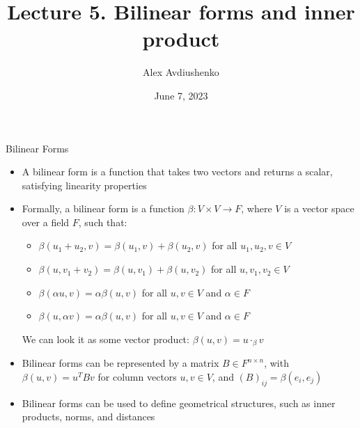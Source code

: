 \documentclass[fullscreen=true, bookmarks=true, hyperref={pdfencoding=unicode}]{beamer}
\title{Lecture 5. Bilinear forms and inner product}
\author{Alex Avdiushenko}
\institute{Neapolis University Paphos}
\date{June 7, 2023}
\begin{document}

\begin{frame}
\transdissolve[duration=0.2]
\titlepage
\end{frame}

\begin{frame}{Bilinear Forms}
  \begin{itemize}
    \item A bilinear form is a function that takes two vectors and 
    returns a scalar, satisfying linearity properties
    \pause
    \item Formally, a bilinear form is a function $\beta: V \times V \rightarrow F$, 
    where $V$ is a vector space over a field $F$, such that:
      \begin{itemize}
        \item $\beta(u_1 + u_2, v) = \beta(u_1, v) + \beta(u_2, v)$ for all $u_1, u_2, v \in V$
        \item $\beta(u, v_1 + v_2) = \beta(u, v_1) + \beta(u, v_2)$ for all $u, v_1, v_2 \in V$
        \item $\beta(\alpha u, v) = \alpha \beta(u, v)$ for all $u, v \in V$ and $\alpha \in F$
        \item $\beta(u, \alpha v) = \alpha \beta(u, v)$ for all $u, v \in V$ and $\alpha \in F$
      \end{itemize}
      We can look it as some vector product: $\beta(u, v) = u \cdot_\beta v$
    
    \pause\item Bilinear forms can be represented by a matrix 
    $B \in F^{n \times n}$, 
    with $\beta(u, v) = u^TBv$ for column vectors $u, v \in V$, 
    and $(B)_{ij} = \beta(e_i, e_j)$
    \pause\item Bilinear forms can be used to define geometrical structures, 
    such as inner products, norms, and distances
  \end{itemize}
\end{frame}
\end{document}

